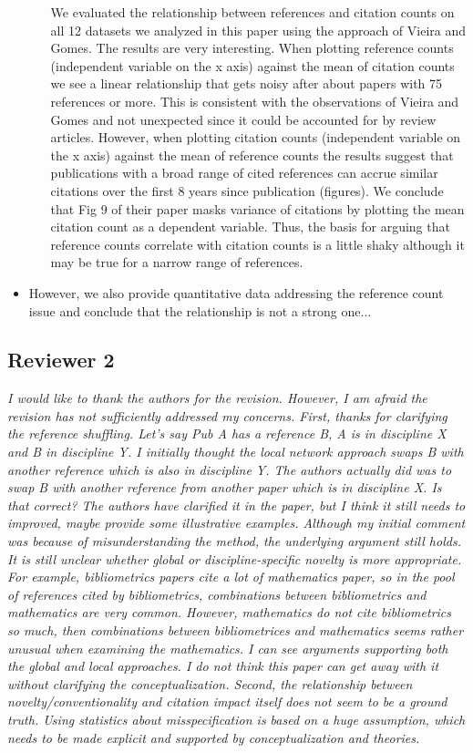 \documentclass[NETN]{stjour}
\begin{document}
\begin{itemize}
\begin{enumerate}
We evaluated the relationship between references and citation counts on all 12 datasets we analyzed in this paper using the approach of Vieira and Gomes. The results are very interesting. When plotting reference counts (independent variable on the x axis) against the mean of citation counts we see a linear relationship that gets noisy after about papers with 75 references or more. This is consistent with the observations of Vieira and Gomes and not unexpected since it could be accounted for by review articles. However, when plotting citation counts (independent variable on the x axis) against the mean of reference counts the results suggest that publications with a broad range of cited references can accrue similar citations over the first 8 years since publication (figures). We conclude that Fig 9 of their paper masks variance of citations by plotting the mean citation count as a dependent variable. Thus, the basis for arguing that reference counts correlate with citation counts is a little shaky although it may be true for a narrow range of references. 
\end{enumerate}
\vspace{2mm}
\item However, we also provide quantitative data addressing the reference count issue and conclude that the relationship is not a strong one...
\end{itemize}

\subsection{Reviewer 2}

\emph{I would like to thank the authors for the revision.  However, I am afraid the revision has not sufficiently addressed my concerns. First, thanks for clarifying the reference shuffling.  Let’s say Pub A has a reference B, A is in discipline X and B in discipline Y.  I initially thought the local network approach swaps B with another reference which is also in discipline Y.  The authors actually did was to swap B with another reference from another paper which is in discipline X.  Is that correct?  The authors have clarified it in the paper, but I think it still needs to improved, maybe provide some illustrative examples.  Although my initial comment was because of misunderstanding the method, the underlying argument still holds.  It is still unclear whether global or discipline-specific novelty is more appropriate.  For example, bibliometrics papers cite a lot of mathematics paper, so in the pool of references cited by bibliometrics, combinations between bibliometrics and mathematics are very common.  However, mathematics do not cite bibliometrics so much, then combinations between bibliometrices and mathematics seems rather unusual when examining the mathematics.  I can see arguments supporting both the global and local approaches.  I do not think this paper can get away with it without clarifying the conceptualization. Second, the relationship between novelty/conventionality and citation impact itself does not seem to be a ground truth. Using statistics about misspecification is based on a huge assumption, which needs to be made explicit and supported by conceptualization and theories.}
\end{document}
